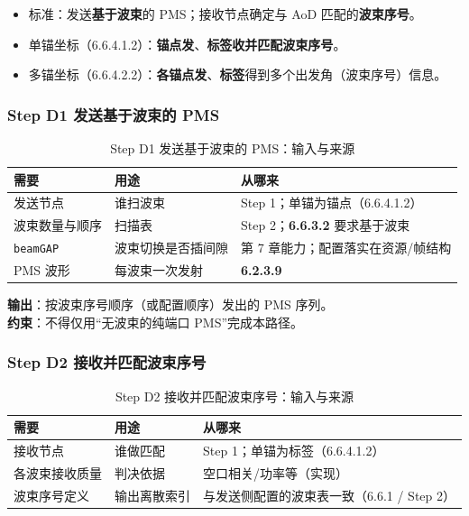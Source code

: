 \documentclass[11pt,a4paper]{ctexart}
\begin{document}
\begin{itemize}[nosep]
  \item 标准：发送\textbf{基于波束}的 PMS；接收节点确定与 AoD 匹配的\textbf{波束序号}。
  \item 单锚坐标（6.6.4.1.2）：\textbf{锚点发}、\textbf{标签收并匹配波束序号}。
  \item 多锚坐标（6.6.4.2.2）：\textbf{各锚点发}、\textbf{标签}得到多个出发角（波束序号）信息。
\end{itemize}

\subsubsection{Step D1 发送基于波束的 PMS}

\begin{longtable}{L{3.2cm}L{5.0cm}L{4.8cm}}
\caption{Step D1 发送基于波束的 PMS：输入与来源\label{tab:step118}} \\
\toprule
\textbf{需要} & \textbf{用途} & \textbf{从哪来} \\
\midrule
发送节点 & 谁扫波束 & Step 1；单锚为锚点（6.6.4.1.2） \\
波束数量与顺序 & 扫描表 & Step 2；\textbf{6.6.3.2} 要求基于波束 \\
\texttt{beamGAP} & 波束切换是否插间隙 & 第 7 章能力；配置落实在资源/帧结构 \\
PMS 波形 & 每波束一次发射 & \textbf{6.2.3.9} \\
\bottomrule
\end{longtable}

\textbf{输出}：按波束序号顺序（或配置顺序）发出的 PMS 序列。\\
\textbf{约束}：不得仅用``无波束的纯端口 PMS''完成本路径。

\subsubsection{Step D2 接收并匹配波束序号}

\begin{longtable}{L{3.2cm}L{5.0cm}L{4.8cm}}
\caption{Step D2 接收并匹配波束序号：输入与来源\label{tab:step119}} \\
\toprule
\textbf{需要} & \textbf{用途} & \textbf{从哪来} \\
\midrule
接收节点 & 谁做匹配 & Step 1；单锚为标签（6.6.4.1.2） \\
各波束接收质量 & 判决依据 & 空口相关/功率等（实现） \\
波束序号定义 & 输出离散索引 & 与发送侧配置的波束表一致（6.6.1 / Step 2） \\
\bottomrule
\end{longtable}
\end{document}

